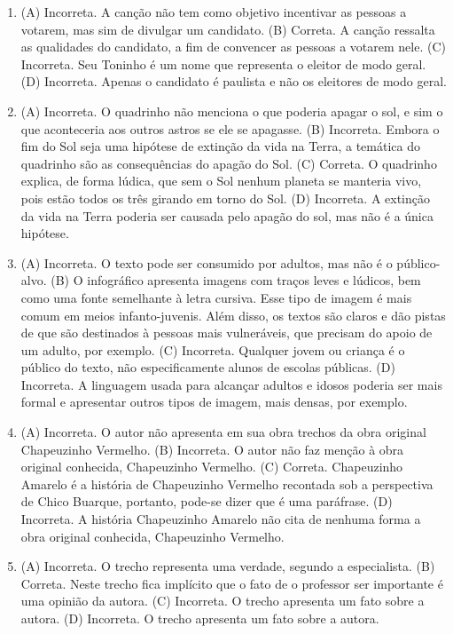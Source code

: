 \begin{enumerate}
\item (A) Incorreta. A canção não tem como objetivo incentivar as pessoas a
votarem, mas sim de divulgar um candidato.
(B) Correta. A canção ressalta as qualidades do candidato, a fim de
convencer as pessoas a votarem nele.
(C) Incorreta. Seu Toninho é um nome que representa o eleitor de modo
geral.
(D) Incorreta. Apenas o candidato é paulista e não os eleitores de modo
geral.

\item (A) Incorreta. O quadrinho não menciona o que poderia apagar o sol, e sim
o que aconteceria aos outros astros se ele se apagasse.
(B) Incorreta. Embora o fim do Sol seja uma hipótese de extinção da vida
na Terra, a temática do quadrinho são as consequências do apagão do Sol.
(C) Correta. O quadrinho explica, de forma lúdica, que sem o Sol nenhum
planeta se manteria vivo, pois estão todos os três girando em torno do
Sol.
(D) Incorreta. A extinção da vida na Terra poderia ser causada pelo
apagão do sol, mas não é a única hipótese.

\item (A) Incorreta. O texto pode ser consumido por adultos, mas não é o
público-alvo.
(B) O infográfico apresenta imagens com traços leves e lúdicos, bem como
uma fonte semelhante à letra cursiva. Esse tipo de imagem é mais comum
em meios infanto-juvenis. Além disso, os textos são claros e dão pistas
de que são destinados à pessoas mais vulneráveis, que precisam do apoio
de um adulto, por exemplo.
(C) Incorreta. Qualquer jovem ou criança é o público do texto, não
especificamente alunos de escolas públicas.
(D) Incorreta. A linguagem usada para alcançar adultos e idosos poderia
ser mais formal e apresentar outros tipos de imagem, mais densas, por
exemplo.

\item (A) Incorreta. O autor não apresenta em sua obra trechos da obra original
Chapeuzinho Vermelho.
(B) Incorreta. O autor não faz menção à obra original conhecida,
Chapeuzinho Vermelho.
(C) Correta. Chapeuzinho Amarelo é a história de Chapeuzinho Vermelho
recontada sob a perspectiva de Chico Buarque, portanto, pode-se dizer
que é uma paráfrase.
(D) Incorreta. A história Chapeuzinho Amarelo não cita de nenhuma forma a
obra original conhecida, Chapeuzinho Vermelho.

\item (A) Incorreta. O trecho representa uma verdade, segundo a especialista.
(B) Correta. Neste trecho fica implícito que o fato de o professor ser
importante é uma opinião da autora.
(C) Incorreta. O trecho apresenta um fato sobre a autora.
(D) Incorreta. O trecho apresenta um fato sobre a autora.


\end{enumerate}
